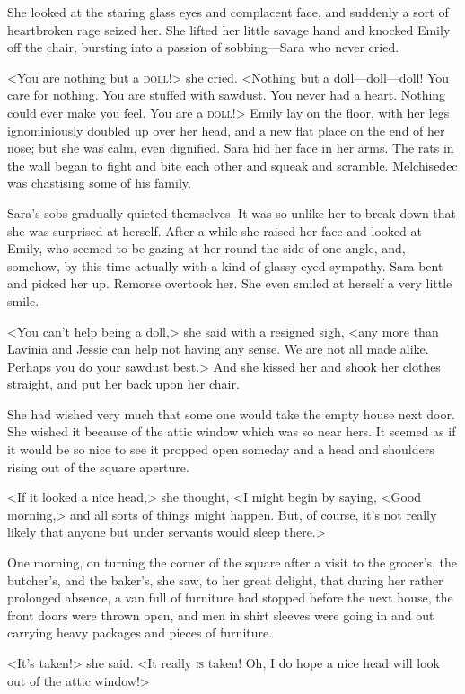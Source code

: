 She looked at the staring glass eyes and complacent face, and suddenly a sort of heartbroken rage seized her. She lifted her little savage hand and knocked Emily off the chair, bursting into a passion of sobbing—Sara who never cried.

<You are nothing but a \textsc{doll}!> she cried. <Nothing but a doll—doll—doll! You care for nothing. You are stuffed with sawdust. You never had a heart. Nothing could ever make you feel. You are a \textsc{doll}!> Emily lay on the floor, with her legs ignominiously doubled up over her head, and a new flat place on the end of her nose; but she was calm, even dignified. Sara hid her face in her arms. The rats in the wall began to fight and bite each other and squeak and scramble. Melchisedec was chastising some of his family.

Sara's sobs gradually quieted themselves. It was so unlike her to break down that she was surprised at herself. After a while she raised her face and looked at Emily, who seemed to be gazing at her round the side of one angle, and, somehow, by this time actually with a kind of glassy-eyed sympathy. Sara bent and picked her up. Remorse overtook her. She even smiled at herself a very little smile.

<You can't help being a doll,> she said with a resigned sigh, <any more than Lavinia and Jessie can help not having any sense. We are not all made alike. Perhaps you do your sawdust best.> And she kissed her and shook her clothes straight, and put her back upon her chair.

She had wished very much that some one would take the empty house next door. She wished it because of the attic window which was so near hers. It seemed as if it would be so nice to see it propped open someday and a head and shoulders rising out of the square aperture.

<If it looked a nice head,> she thought, <I might begin by saying, <Good morning,> and all sorts of things might happen. But, of course, it's not really likely that anyone but under servants would sleep there.>

One morning, on turning the corner of the square after a visit to the grocer's, the butcher's, and the baker's, she saw, to her great delight, that during her rather prolonged absence, a van full of furniture had stopped before the next house, the front doors were thrown open, and men in shirt sleeves were going in and out carrying heavy packages and pieces of furniture.

<It's taken!> she said. <It really \textsc{is} taken! Oh, I do hope a nice head will look out of the attic window!>

